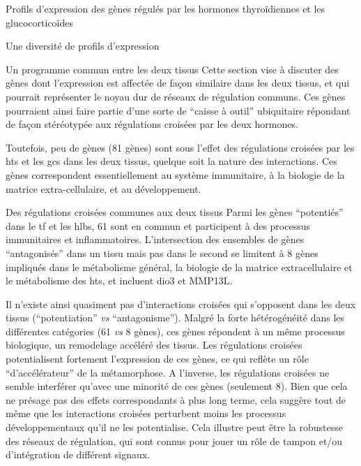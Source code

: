 \documentclass[../main.tex]{subfiles}
\begin{document}
\begin{chapter}{Profils d'expression des gènes régulés par les hormones thyroïdiennes et les glucocorticoïdes}
\begin{section}{Une diversité de profils d'expression}
\begin{subsection}{Un programme commun entre les deux tissus}
Cette section vise à discuter des gènes dont l'expression est affectée de façon similaire dans les deux tissus, et qui pourrait représenter le noyau dur de réseaux de régulation communs.
Ces gènes pourraient ainsi faire partie d'une sorte de ``caisse à outil'' ubiquitaire répondant de façon stéréotypée aux régulations croisées par les deux hormones.
\par
Toutefois, peu de gènes (81 gènes) sont sous l'effet des régulations croisées par les \glspl{ht} et les \glspl{gc} dans les deux tissus, quelque soit la nature des interactions.
Ces gènes correspondent essentiellement au système immunitaire, à la biologie de la matrice extra-cellulaire, et au développement.

\begin{subsubsection}{Des régulations croisées communes aux deux tissus}
Parmi les gènes ``potentiés'' dans le \gls{tf} et les \glspl{hlb}, 61 sont en commun et participent à des processus immunitaires et inflammatoires.
L'intersection des ensembles de gènes ``antagonisés'' dans un tissu mais pas dans le second se limitent à 8 gènes impliqués dans le métabolisme général, la biologie de la matrice extracellulaire et le métabolisme des \glspl{ht}, et incluent \gls{dio3} et MMP13L.
\par
Il n'existe ainsi quasiment pas d'interactions croisées qui s'opposent dans les deux tissus (``potentiation'' \textit{vs} ``antagonisme'').
Malgré la forte hétérogénéité dans les différentes catégories (61 \textit{vs} 8 gènes), ces gènes répondent à un même processus biologique, un remodelage accéléré des tissus.
Les régulations croisées potentialisent fortement l'expression de ces gènes, ce qui reflète un rôle ``d'accélérateur'' de la métamorphose.
A l'inverse, les régulations croisées ne semble interférer qu'avec une minorité de ces gènes (seulement 8).
Bien que cela ne présage pas des effets correspondants à plus long terme, cela suggère tout de même que les interactions croisées perturbent moins les processus développementaux qu'il ne les potentialise.
Cela illustre peut être la robustesse des réseaux de régulation, qui sont connus pour jouer un rôle de tampon et/ou d'intégration de différent signaux.
\end{subsubsection}


\end{subsection}
\end{section}
\end{chapter}
\end{document}
